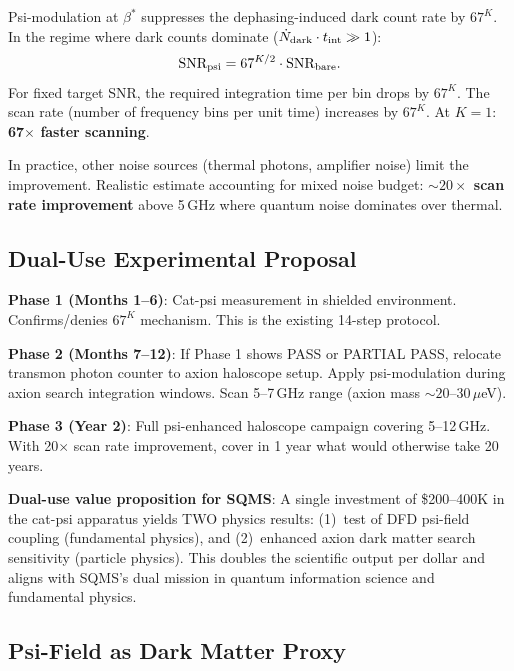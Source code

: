 \documentclass[11pt]{article}
\theoremstyle{definition}
\theoremstyle{remark}
\begin{document}
Psi-modulation at $\beta^*$ suppresses the dephasing-induced dark count
rate by $67^K$. In the regime where dark counts dominate
($\dot{N}_{\rm dark} \cdot t_{\rm int} \gg 1$):
\begin{equation}
\text{SNR}_{\rm psi} = 67^{K/2} \cdot \text{SNR}_{\rm bare}.
\end{equation}
For fixed target SNR, the required integration time per bin drops by
$67^K$. The scan rate (number of frequency bins per unit time) increases
by $67^K$. At $K=1$: \textbf{67$\times$ faster scanning}.

In practice, other noise sources (thermal photons, amplifier noise)
limit the improvement. Realistic estimate accounting for mixed noise
budget: \textbf{$\sim 20\times$ scan rate improvement} above 5\,GHz
where quantum noise dominates over thermal.

\subsection{Dual-Use Experimental Proposal}

\textbf{Phase 1 (Months 1--6)}: Cat-psi measurement in shielded
environment. Confirms/denies $67^K$ mechanism. This is the existing
14-step protocol.

\textbf{Phase 2 (Months 7--12)}: If Phase 1 shows PASS or PARTIAL PASS,
relocate transmon photon counter to axion haloscope setup. Apply
psi-modulation during axion search integration windows. Scan 5--7\,GHz
range (axion mass $\sim 20$--30\,$\mu$eV).

\textbf{Phase 3 (Year 2)}: Full psi-enhanced haloscope campaign covering
5--12\,GHz. With 20$\times$ scan rate improvement, cover in 1 year what
would otherwise take 20 years.

\begin{tcolorbox}[colback=yellow!5!white, colframe=yellow!70!black]
\textbf{Dual-use value proposition for SQMS}: A single investment of
\$200--400K in the cat-psi apparatus yields TWO physics results:
(1)~test of DFD psi-field coupling (fundamental physics), and
(2)~enhanced axion dark matter search sensitivity (particle physics).
This doubles the scientific output per dollar and aligns with SQMS's
dual mission in quantum information science and fundamental physics.
\end{tcolorbox}

\subsection{Psi-Field as Dark Matter Proxy}
\end{document}
